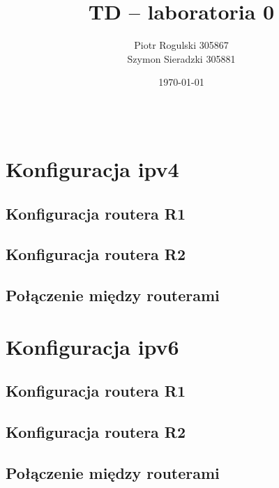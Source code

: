 \documentclass[a4paper,12pt,notitlepage]{article}
\title{\textbf{TD -- laboratoria 0}}
\author{Piotr Rogulski 305867 \\ Szymon Sieradzki 305881}
\date{\today}
\begin{document}
\maketitle

\inputminted[label=Output, firstline=20]{text}{R1_1_copy.txt}

\section{Konfiguracja ipv4}
\subsection{Konfiguracja routera R1}
\subsection{Konfiguracja routera R2}
\subsection{Połączenie między routerami}
\section{Konfiguracja ipv6}
\subsection{Konfiguracja routera R1}
\subsection{Konfiguracja routera R2}
\subsection{Połączenie między routerami}
\end{document}

